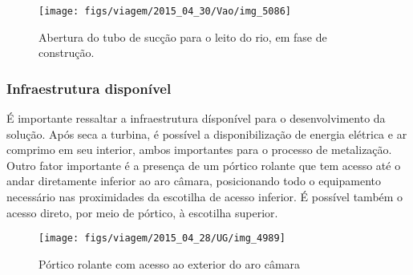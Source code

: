 \begin{figure}[H]	
	\texttt{[image: figs/viagem/2015\_04\_30/Vao/img\_5086]}
	\caption{Abertura do tubo de sucção para o leito do rio, em fase de
	construção.}
	\label{fig::tubo_suc}
\end{figure}

\subsubsection{Infraestrutura disponível}
É importante ressaltar a infraestrutura dísponível para o desenvolvimento da solução. 
Após seca a turbina, é possível a disponibilização de energia elétrica e ar comprimo 
em seu interior, ambos importantes para o processo de metalização. Outro fator 
importante é a presença de um pórtico rolante que tem acesso até o andar diretamente 
inferior ao aro câmara, posicionando todo o equipamento necessário nas proximidades 
da escotilha de acesso inferior. É possível também o acesso direto, por meio de pórtico, 
à escotilha superior.

\begin{figure}[h!]	
	\texttt{[image: figs/viagem/2015\_04\_28/UG/img\_4989]}
	\caption{Pórtico rolante com acesso ao exterior do aro câmara}
	\label{fig::portico}
\end{figure}






